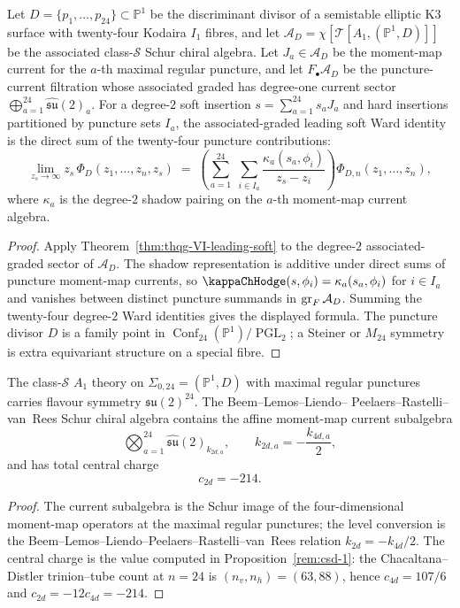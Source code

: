 \begin{proposition}
\label{rem:softgrav-1}
Let $D=\{p_1,\ldots,p_{24}\}\subset\mathbb P^1$ be the discriminant
divisor of a semistable elliptic K3 surface with twenty-four
Kodaira $I_1$ fibres, and let
$\mathcal A_D=\chi[\mathcal T[A_1,(\mathbb P^1,D)]]$ be the associated
class-$\mathcal S$ Schur chiral algebra. Let
$J_a\in\mathcal A_D$ be the moment-map current for the
$a$-th maximal regular puncture, and let $F_\bullet\mathcal A_D$ be
the puncture-current filtration whose associated graded has degree-one
current sector $\bigoplus_{a=1}^{24}\widehat{\mathfrak{su}}(2)_a$.
For a degree-$2$ soft insertion
$s=\sum_{a=1}^{24}s_aJ_a$ and hard insertions partitioned by puncture
sets $I_a$, the associated-graded leading soft Ward identity is the
direct sum of the twenty-four puncture contributions:
\[
\lim_{z_s\to\infty}z_s\,\Phi_D(z_1,\ldots,z_n,z_s)
\;=\;
\left(
\sum_{a=1}^{24}\;
\sum_{i\in I_a}
\frac{\kappa_a(s_a,\phi_i)}{z_s-z_i}
\right)
\Phi_{D,n}(z_1,\ldots,z_n),
\]
where $\kappa_a$ is the degree-$2$ shadow pairing on the
$a$-th moment-map current algebra.
\end{proposition}

\begin{proof}
Apply Theorem~\ref{thm:thqg-VI-leading-soft} to the degree-$2$
associated-graded sector of $\mathcal A_D$. The shadow representation
is additive under direct sums of puncture moment-map currents, so
$\kappaChHodge(s,\phi_i)=\kappa_a(s_a,\phi_i)$ for $i\in I_a$ and vanishes
between distinct puncture summands in $\operatorname{gr}_F\mathcal A_D$. Summing the
twenty-four degree-$2$ Ward identities gives the displayed formula.
The puncture divisor
$D$ is a family point in
\(\operatorname{Conf}_{24}(\mathbb P^1)/\operatorname{PGL}_2\); a
Steiner or $M_{24}$ symmetry is extra equivariant structure on a
special fibre.
\end{proof}

\begin{proposition}
\label{rem:softgrav-2}
The class-$\mathcal S$ $A_1$ theory on
$\Sigma_{0,24}=(\mathbb P^1,D)$ with maximal regular punctures carries
flavour symmetry $\mathfrak{su}(2)^{24}$. The Beem--Lemos--Liendo--
Peelaers--Rastelli--van~Rees Schur chiral algebra contains the affine
moment-map current subalgebra
\[
\bigotimes_{a=1}^{24}\widehat{\mathfrak{su}}(2)_{k_{2d,a}},
\qquad
k_{2d,a}=-\frac{k_{4d,a}}{2},
\]
and has total central charge
\[
c_{2d}=-214.
\]
\end{proposition}

\begin{proof}
The current subalgebra is the Schur image of the four-dimensional
moment-map operators at the maximal regular punctures; the level
conversion is the Beem--Lemos--Liendo--Peelaers--Rastelli--van~Rees
relation $k_{2d}=-k_{4d}/2$. The central charge is the value computed
in Proposition~\ref{rem:csd-1}: the Chacaltana--Distler
trinion--tube count at $n=24$ is $(n_v,n_h)=(63,88)$, hence
$c_{4d}=107/6$ and $c_{2d}=-12c_{4d}=-214$.
\end{proof}
